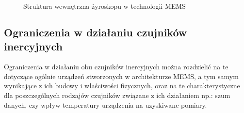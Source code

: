 	\begin{figure}[!htp]
			
		\caption{Struktura wewnętrzna żyroskopu w technologii MEMS}
		\label{fig:characteristics:imu:gyro:mems}
	\end{figure}
	
	\subsection{Ograniczenia w działaniu czujników inercyjnych}
	Ograniczenia w działaniu obu czujników inercyjnych można rozdzielić na te dotyczące ogólnie urządzeń stworzonych w architekturze MEMS, a tym samym wynikające z ich budowy i właściwości fizycznych, oraz na te charakterystyczne dla poszczególnych rodzajów czujników związane z ich działaniem np.: szum danych, czy wpływ temperatury urządzenia na uzyskiwane pomiary.
	
